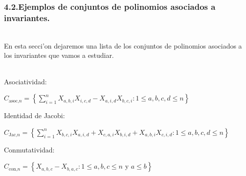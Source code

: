 \documentclass[10pt]{beamer}
\begin{document}
\begin{frame}
\frametitle{4.2.Ejemplos de conjuntos de polinomios asociados a invariantes.}\\
En esta secci'on dejaremos una lista de los conjuntos de polinomios asociados a los invariantes que vamos a estudiar.\\
\\
\begin{block}{Asociatividad:}
\begin{center}
$C_{\text{asoc,}n}= \displaystyle \left \{ \sum_{i=1}^{n} X_{a,b,i} X_{i,c,d} -  X_{a,i,d} X_{b,c,i}:1\leq a,b,c,d \leq n \right \}$\\
\end{center}
\end{block}
\begin{block}{Identidad de Jacobi:}\\
\begin{center}
$C_{\text{Jac,}n}= \displaystyle \left \{\sum_{i=1}^{n} X_{b,c,i} X_{a,i,d}+ X_{c,a,i} X_{b,i,d}+X_{a,b,i} X_{c,i,d} :1\leq a,b,c,d\leq n \right\}$\\
\end{center}
\end{block}
\begin{block}{Conmutatividad:}\\
\begin{center}
$C_{\text{con,}n}= \displaystyle \left \{ X_{a,b,c} - X_{b,a,c}:1\leq a,b,c\leq n \text{ y } a \leq b \right\}$\\
\end{center}
\end{block}
\end{frame}
\end{document}
